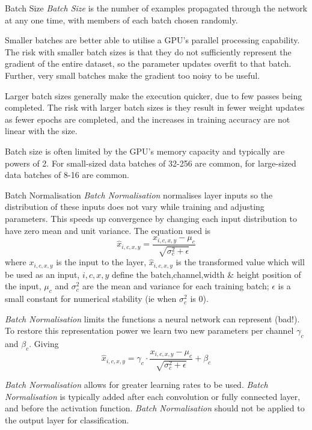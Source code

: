 \documentclass[11pt,a4paper]{article}
\begin{document}
  \begin{remark}{Batch Size}
    \textit{Batch Size} is the number of examples propagated through the network at any one time, with members of each batch chosen randomly.
    \par Smaller batches are better able to utilise a GPU's parallel processing capability. The risk with smaller batch sizes is that they do not sufficiently represent the gradient of the entire dataset, so the parameter updates overfit to that batch. Further, very small batches make the gradient too noisy to be useful.
    \par Larger batch sizes generally make the execution quicker, due to few passes being completed. The risk with larger batch sizes is they result in fewer weight updates as fewer epochs are completed, and the increases in training accuracy are not linear with the size.
    \par Batch size is often limited by the GPU's memory capacity and typically are powers of 2. For small-sized data batches of 32-256 are common, for large-sized data batches of 8-16 are common.
  \end{remark}

  \begin{definition}{Batch Normalisation}
    \textit{Batch Normalisation} normalises layer inputs so the distribution of these inputs does not vary while training and adjusting parameters. This speeds up convergence by changing each input distribution to have zero mean and unit variance. The equation used is
    \[ \hat{x}_{i,c,x,y}=\frac{x_{i,c,x,y}-\mu_c}{\sqrt{\sigma^2_c+\epsilon}} \]
    where $x_{i,c,x,y}$ is the input to the layer, $\hat{x}_{i,c,x,y}$ is the transformed value which will be used as an input, $i,c,x,y$ define the batch,channel,width \& height position of the input, $\mu_c$ and $\sigma^2_c$ are the mean and variance for each training batch; $\epsilon$ is a small constant for numerical stability (ie when $\sigma^2_c$ is 0).
    \par \textit{Batch Normalisation} limits the functions a neural network can represent (bad!). To restore this representation power we learn two new parameters per channel $\gamma_c$ and $\beta_c$. Giving
    \[ \hat{x}_{i,c,x,y}=\gamma_c\cdot\frac{x_{i,c,x,y}-\mu_c}{\sqrt{\sigma^2_c+\epsilon}}+\beta_c \]
    \par \textit{Batch Normalisation} allows for greater learning rates to be used.
    \textit{Batch Normalisation} is typically added after each convolution or fully connected layer, and before the activation function. \textit{Batch Normalisation} should not be applied to the output layer for classification.
  \end{definition}
\end{document}

